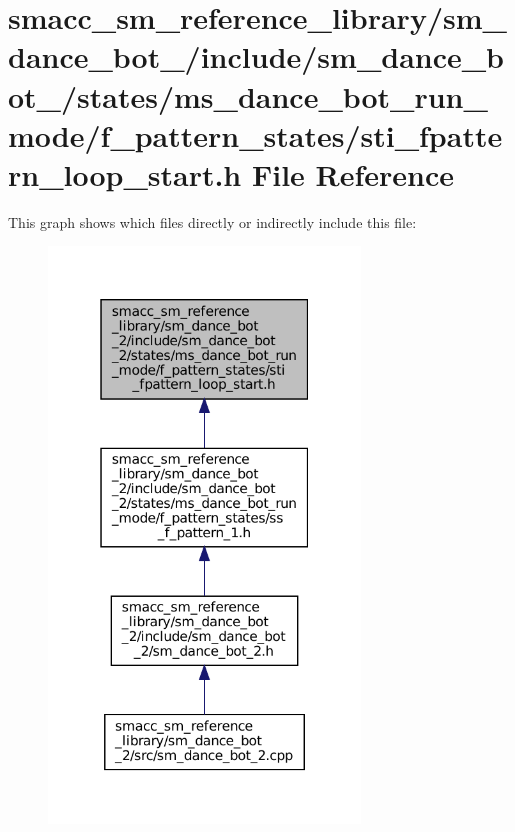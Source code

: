 \hypertarget{sm__dance__bot__2_2include_2sm__dance__bot__2_2states_2ms__dance__bot__run__mode_2f__pattern__st405d15900ffad76de6026d57229b8667}{}\section{smacc\+\_\+sm\+\_\+reference\+\_\+library/sm\+\_\+dance\+\_\+bot\+\_/include/sm\+\_\+dance\+\_\+bot\+\_/states/ms\+\_\+dance\+\_\+bot\+\_\+run\+\_\+mode/f\+\_\+pattern\+\_\+states/sti\+\_\+fpattern\+\_\+loop\+\_\+start.h File Reference}
\label{sm__dance__bot__2_2include_2sm__dance__bot__2_2states_2ms__dance__bot__run__mode_2f__pattern__st405d15900ffad76de6026d57229b8667}
This graph shows which files directly or indirectly include this file\+:
\nopagebreak
\begin{figure}[H]
\begin{center}
\leavevmode
\includegraphics[width=235pt]{sm__dance__bot__2_2include_2sm__dance__bot__2_2states_2ms__dance__bot__run__mode_2f__pattern__st3860a7880f3cbe3eb821c30150e4deff}
\end{center}
\end{figure}

